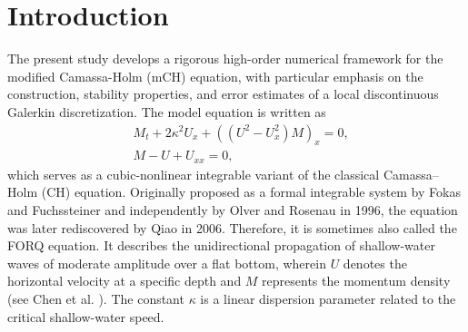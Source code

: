 \documentclass[11pt]{article}
\numberwithin{equation}{section}
\begin{document}
\section{Introduction}
\label{sec:1}
The present study develops a rigorous high-order numerical framework for the modified Camassa-Holm (mCH) equation, with particular emphasis on the construction, stability properties, and error estimates of a local discontinuous Galerkin discretization. The model equation is written as
\begin{subequations}\label{eq:mch}
\begin{align}
&M_t+2\kappa^2U_x+((U^2-U_x^2)M)_x=0,\label{eq:mch:1}\\
&M-U+U_{xx}=0,\label{eq:mch:2}
\end{align}
\end{subequations}
which serves as a cubic-nonlinear integrable variant of the classical Camassa–Holm (CH) equation. Originally proposed as a formal integrable system by Fokas and Fuchssteiner \cite{Fokas1995PD,fofu1981,fuchssteiner1996some} and independently by Olver and Rosenau in 1996, the equation was later rediscovered by Qiao \cite{Qiao2006JMP} in 2006. Therefore, it is sometimes also called the FORQ equation. It describes the unidirectional propagation of shallow-water waves of moderate amplitude over a flat bottom, wherein $U$ denotes the horizontal velocity at a specific depth and $M$ represents the momentum density (see Chen et al. \cite{chen2022JMFM}). The constant $\kappa$ is a linear dispersion parameter related to the critical shallow-water speed.
\end{document}

